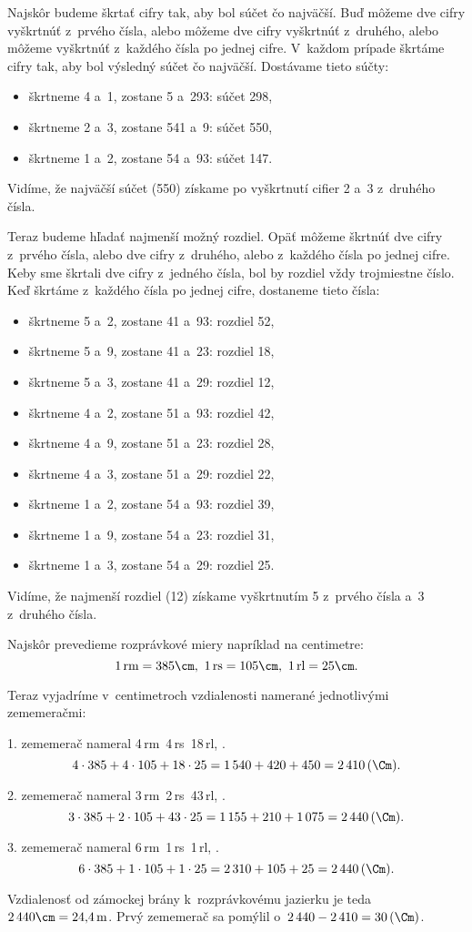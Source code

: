 {%
Najskôr budeme škrtať cifry tak, aby bol súčet čo najväčší.
Buď môžeme dve cifry vyškrtnúť z~prvého čísla, alebo môžeme dve cifry
vyškrtnúť z~druhého, alebo môžeme vyškrtnúť z~každého čísla po jednej
cifre.
V~každom prípade škrtáme cifry tak, aby bol výsledný súčet čo najväčší.
Dostávame tieto súčty:
\begin{itemize}
  \item škrtneme 4 a~1, zostane 5 a~293: súčet 298,
  \item škrtneme 2 a~3, zostane 541 a~9: súčet 550,
  \item škrtneme 1 a~2, zostane 54 a~93: súčet 147.
\end{itemize}
Vidíme, že najväčší súčet (550) získame po vyškrtnutí cifier 2 a~3 z~druhého čísla.

Teraz budeme hľadať najmenší možný rozdiel.
Opäť môžeme škrtnúť  dve cifry z~prvého čísla, alebo dve cifry
z~druhého, alebo  z~každého čísla po jednej cifre.
Keby sme škrtali dve cifry z~jedného čísla, bol by rozdiel vždy trojmiestne číslo.
Keď škrtáme z~každého čísla po jednej cifre, dostaneme tieto čísla:
\begin{itemize}
  \item škrtneme 5 a~2, zostane 41 a~93: rozdiel 52,
  \item škrtneme 5 a~9, zostane 41 a~23: rozdiel 18,
  \item škrtneme 5 a~3, zostane 41 a~29: rozdiel 12,
  \item škrtneme 4 a~2, zostane 51 a~93: rozdiel 42,
  \item škrtneme 4 a~9, zostane 51 a~23: rozdiel 28,
  \item škrtneme 4 a~3, zostane 51 a~29: rozdiel 22,
  \item škrtneme 1 a~2, zostane 54 a~93: rozdiel 39,
  \item škrtneme 1 a~9, zostane 54 a~23: rozdiel 31,
  \item škrtneme 1 a~3, zostane 54 a~29: rozdiel 25.
\end{itemize}
Vidíme, že najmenší rozdiel (12) získame vyškrtnutím 5 z~prvého čísla a~3 z~druhého čísla.
}

{%
Najskôr prevedieme rozprávkové miery napríklad na centimetre:
$$
1\,\text{rm}=385\cm,\ 1\,\text{rs}=105\cm,\ 1\,\text{rl}=25\cm.
$$

Teraz vyjadríme v~centimetroch vzdialenosti namerané jednotlivými zememeračmi:

1. zememerač nameral 4\,rm~4\,rs~18\,rl, \tj.
$$
4\cdot385+4\cdot105+18\cdot25 =1\,540+420+450 =2\,410\,(\Cm).
$$

2. zememerač nameral 3\,rm~2\,rs~43\,rl, \tj.
$$
3\cdot385+2\cdot105+43\cdot25 = 1\,155+210+1\,075=2\,440\,(\Cm).
$$

3. zememerač nameral 6\,rm~1\,rs~1\,rl, \tj.
$$
6\cdot385+1\cdot105+1\cdot25 =2\,310+105+25 =2\,440\,(\Cm).
$$

Vzdialenosť od zámockej brány k~rozprávkovému jazierku je teda $2\,440\cm =24{,}4\,\text{m}$.
Prvý zememerač sa pomýlil o~$2\,440-2\,410 =30\,(\Cm)$.
}

